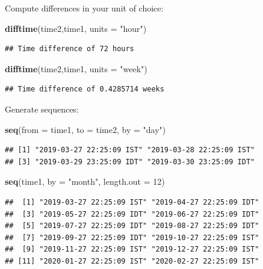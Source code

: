 \documentclass[]{book}
\newenvironment{Shaded}{\begin{snugshade}}{\end{snugshade}}
\newcommand{\KeywordTok}[1]{\textcolor[rgb]{0.13,0.29,0.53}{\textbf{#1}}}
\newcommand{\DataTypeTok}[1]{\textcolor[rgb]{0.13,0.29,0.53}{#1}}
\newcommand{\DecValTok}[1]{\textcolor[rgb]{0.00,0.00,0.81}{#1}}
\newcommand{\StringTok}[1]{\textcolor[rgb]{0.31,0.60,0.02}{#1}}
\newcommand{\NormalTok}[1]{#1}
\theoremstyle{definition}
\theoremstyle{definition}
\theoremstyle{definition}
\theoremstyle{remark}
\begin{document}
Compute differences in your unit of choice:

\begin{Shaded}
\begin{Highlighting}[]
\KeywordTok{difftime}\NormalTok{(time2,time1, }\DataTypeTok{units =}  \StringTok{"hour"}\NormalTok{)}
\end{Highlighting}
\end{Shaded}

\begin{verbatim}
## Time difference of 72 hours
\end{verbatim}

\begin{Shaded}
\begin{Highlighting}[]
\KeywordTok{difftime}\NormalTok{(time2,time1, }\DataTypeTok{units =}  \StringTok{"week"}\NormalTok{)}
\end{Highlighting}
\end{Shaded}

\begin{verbatim}
## Time difference of 0.4285714 weeks
\end{verbatim}

Generate sequences:

\begin{Shaded}
\begin{Highlighting}[]
\KeywordTok{seq}\NormalTok{(}\DataTypeTok{from =}\NormalTok{ time1, }\DataTypeTok{to =}\NormalTok{ time2, }\DataTypeTok{by =} \StringTok{"day"}\NormalTok{) }
\end{Highlighting}
\end{Shaded}

\begin{verbatim}
## [1] "2019-03-27 22:25:09 IST" "2019-03-28 22:25:09 IST"
## [3] "2019-03-29 23:25:09 IDT" "2019-03-30 23:25:09 IDT"
\end{verbatim}

\begin{Shaded}
\begin{Highlighting}[]
\KeywordTok{seq}\NormalTok{(time1, }\DataTypeTok{by =} \StringTok{"month"}\NormalTok{, }\DataTypeTok{length.out =} \DecValTok{12}\NormalTok{)}
\end{Highlighting}
\end{Shaded}

\begin{verbatim}
##  [1] "2019-03-27 22:25:09 IST" "2019-04-27 22:25:09 IDT"
##  [3] "2019-05-27 22:25:09 IDT" "2019-06-27 22:25:09 IDT"
##  [5] "2019-07-27 22:25:09 IDT" "2019-08-27 22:25:09 IDT"
##  [7] "2019-09-27 22:25:09 IDT" "2019-10-27 22:25:09 IST"
##  [9] "2019-11-27 22:25:09 IST" "2019-12-27 22:25:09 IST"
## [11] "2020-01-27 22:25:09 IST" "2020-02-27 22:25:09 IST"
\end{verbatim}
\end{document}
